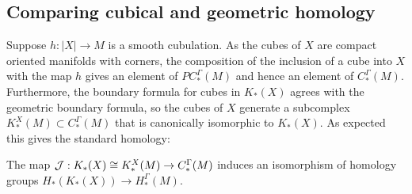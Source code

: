 \subsection{Comparing cubical and geometric homology}\label{S: cubical and geometric homology}

Suppose $h: |X|\to M$ is a smooth cubulation. As the cubes of $X$ are compact oriented manifolds with corners, the composition of the inclusion of a cube into $X$ with the map $h$ gives an element of $PC_*^\Gamma(M)$ and hence an element of $C_*^\Gamma(M)$. Furthermore, the boundary formula for cubes in $K_*(X)$ agrees with the geometric boundary formula, so the cubes of $X$ generate a subcomplex $K^X_*(M)\subset C^\Gamma_*(M)$ that is canonically isomorphic to  $K_*(X)$. As expected this gives the standard homology:

\begin{theorem}\label{T: cubical homology iso}
The map $\mathcal{J}: K_*(X)\cong K^X_*(M)\to C^\Gamma_*(M)$ induces an isomorphism of homology groups $H_*(K_*(X))\to H_*^\Gamma(M)$.
\end{theorem}

